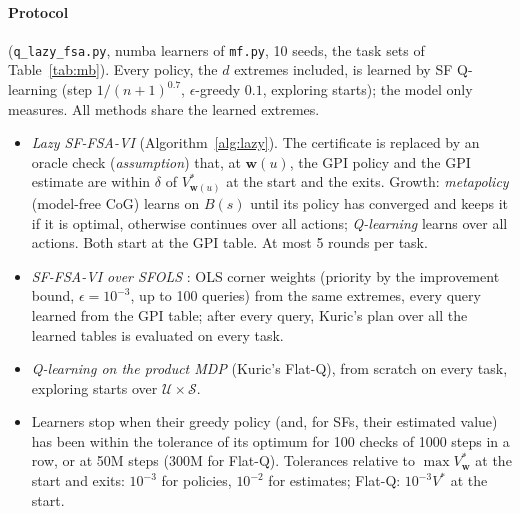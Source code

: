 \documentclass[11pt]{article}
\newcommand{\w}{\mathbf{w}}
\begin{document}
\paragraph{Protocol} (\texttt{q\_lazy\_fsa.py}, numba learners of \texttt{mf.py}, 10 seeds, the task sets of
Table~\ref{tab:mb}). Every policy, the $d$ extremes included, is learned by SF Q-learning (step $1/(n+1)^{0.7}$,
$\epsilon$-greedy $0.1$, exploring starts); the model only measures. All methods share the learned extremes.
\begin{itemize}\setlength\itemsep{1pt}
\item \emph{Lazy SF-FSA-VI} (Algorithm~\ref{alg:lazy}). The certificate is replaced by an oracle check (\emph{assumption})
that, at $\w(u)$, the GPI policy and the GPI estimate are within $\delta$ of $V^*_{\w(u)}$ at the start and the exits.
Growth: \emph{metapolicy} (model-free CoG) learns on $B(s)$ until its policy has converged and keeps it if it is
optimal, otherwise continues over all actions; \emph{Q-learning} learns over all actions. Both start at the GPI table.
At most 5 rounds per task.
\item \emph{SF-FSA-VI over SFOLS} \cite{kuric}: OLS corner weights (priority by the improvement bound, $\epsilon=10^{-3}$,
up to 100 queries) from the same extremes, every query learned from the GPI table; after every query, Kuric's plan over
all the learned tables is evaluated on every task.
\item \emph{Q-learning on the product MDP} (Kuric's Flat-Q), from scratch on every task, exploring starts over
$\mathcal U\times\mathcal S$.
\item Learners stop when their greedy policy (and, for SFs, their estimated value) has been within the tolerance of its
optimum for 100 checks of 1000 steps in a row, or at 50M steps (300M for Flat-Q). Tolerances relative to $\max V^*_\w$
at the start and exits: $10^{-3}$ for policies, $10^{-2}$ for estimates; Flat-Q: $10^{-3}V^*$ at the start.
\end{itemize}
\end{document}
